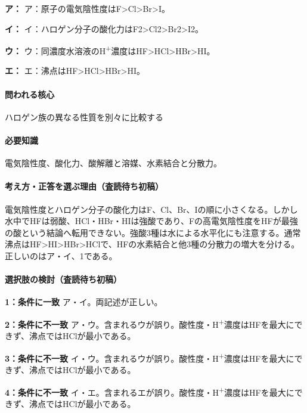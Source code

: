 \noindent\textbf{ア：} ア：原子の電気陰性度はF>Cl>Br>I。\par

\noindent\textbf{イ：} イ：ハロゲン分子の酸化力はF2>Cl2>Br2>I2。\par

\noindent\textbf{ウ：} ウ：同濃度水溶液のH\textsuperscript{+}濃度はHF>HCl>HBr>HI。\par

\noindent\textbf{エ：} エ：沸点はHF>HCl>HBr>HI。\par

\paragraph{問われる核心} ハロゲン族の異なる性質を別々に比較する

\paragraph{必要知識} 電気陰性度、酸化力、酸解離と溶媒、水素結合と分散力。

\paragraph{考え方・正答を選ぶ理由（査読待ち初稿）} 電気陰性度とハロゲン分子の酸化力はF、Cl、Br、Iの順に小さくなる。しかし水中でHFは弱酸、HCl・HBr・HIは強酸であり、Fの高電気陰性度をHFが最強の酸という結論へ転用できない。強酸3種は水による水平化にも注意する。通常沸点はHF>HI>HBr>HClで、HFの水素結合と他3種の分散力の増大を分ける。正しいのはア・イ、1である。

\paragraph{選択肢の検討（査読待ち初稿）}\mbox{}\par

\noindent\textbf{1：条件に一致} ア・イ。両記述が正しい。\par

\noindent\textbf{2：条件に不一致} ア・ウ。含まれるウが誤り。酸性度・H\textsuperscript{+}濃度はHFを最大にできず、沸点ではHClが最小である。\par

\noindent\textbf{3：条件に不一致} イ・ウ。含まれるウが誤り。酸性度・H\textsuperscript{+}濃度はHFを最大にできず、沸点ではHClが最小である。\par

\noindent\textbf{4：条件に不一致} イ・エ。含まれるエが誤り。酸性度・H\textsuperscript{+}濃度はHFを最大にできず、沸点ではHClが最小である。\par

